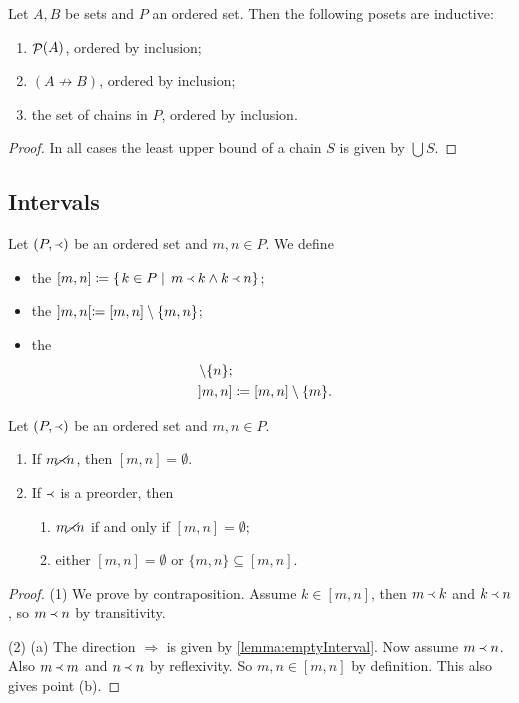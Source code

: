 \begin{proposition} \label{prop:inductive}
Let $A,B$ be sets and $P$ an ordered set. Then the following posets are inductive:
\begin{enumerate}
\item $\mathop{\mathcal{P}}(A)$, ordered by inclusion;
\item $(A \not\to B)$, ordered by inclusion;
\item the set of chains in $P$, ordered by inclusion.
\end{enumerate}
\end{proposition}
\begin{proof}
In all cases the least upper bound of a chain $S$ is given by $\bigcup S$.
\end{proof}

\subsection{Intervals}
\begin{definition}
Let $(P,\Yleft)$ be an ordered set and $m,n\in P$. We define
\begin{itemize}
\item the  $[m,n] \coloneqq \left\{\left. k\in P \;\right|\; m\Yleft k \land k\Yleft n \right\}$;
\item the  $]m,n[ \coloneqq [m,n]\setminus\{m,n\}$;
\item the 
\begin{align*}
[m,n[ &\defeq [m,n]\setminus\{n\}; \\
]m,n] &\defeq [m,n]\setminus\{m\}.
\end{align*}
\end{itemize}
\end{definition}

\begin{lemma} \label{lemma:emptyInterval}
Let $(P,\Yleft)$ be an ordered set and $m,n\in P$.
\begin{enumerate}
\item If $m \cancel\Yleft n$, then $[m,n] = \emptyset$.
\item If $\Yleft$ is a preorder, then
\begin{enumerate}
\item $m \cancel\Yleft n$ \textup{if and only if} $[m,n] = \emptyset$;
\item either $[m,n] = \emptyset$ or $\{m,n\} \subseteq [m,n]$.
\end{enumerate}
\end{enumerate}
\end{lemma}
\begin{proof}
(1) We prove by contraposition. Assume $k\in [m,n]$, then $m\Yleft k$ and $k\Yleft n$, so $m\Yleft n$ by transitivity.

(2) (a) The direction $\Rightarrow$ is given by \ref{lemma:emptyInterval}. Now assume $m \Yleft n$. Also $m\Yleft m$ and $n \Yleft n$ by reflexivity. So $m,n\in [m,n]$ by definition. This also gives point (b).
\end{proof}

